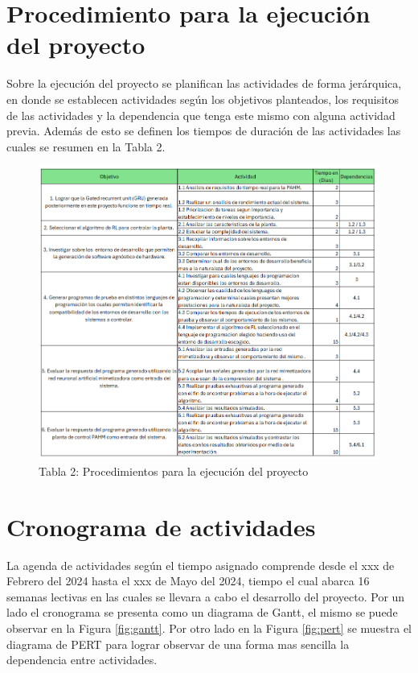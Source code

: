 \documentclass[12pt]{article}
\begin{document}
\section{Procedimiento para la ejecución del proyecto}

Sobre la ejecución del proyecto se planifican las actividades de forma jerárquica, en donde se establecen actividades según los objetivos planteados, los requisitos de las actividades y la dependencia que tenga este mismo con alguna actividad previa. Además de esto se definen los tiempos de duración de las actividades las cuales se resumen en la Tabla 2.

\begin{figure}[h]
  \centering
  \includegraphics[scale=0.6]{tablas/ejecucion.png}
  \captionsetup{labelformat=empty}  %
  \caption{Tabla 2: Procedimientos para la ejecución del proyecto}
\end{figure}

\section{Cronograma de actividades}

La agenda de actividades según el tiempo asignado comprende desde el xxx de Febrero del 2024 hasta el xxx de Mayo del 2024, tiempo el cual abarca 16 semanas lectivas en las cuales se llevara a cabo el desarrollo del proyecto. Por un lado el cronograma se presenta como un diagrama de Gantt, el mismo se puede observar en la Figura \ref{fig:gantt}. Por otro lado en la Figura \ref{fig:pert} se muestra el diagrama de PERT para lograr observar de una forma mas sencilla la dependencia entre actividades.
\end{document}

